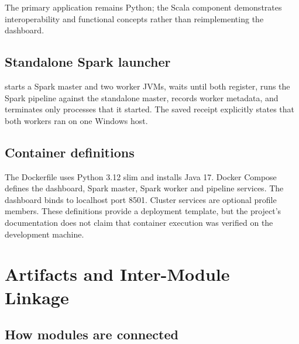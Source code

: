 \documentclass[12pt,a4paper]{report}
\begin{document}
The primary application remains Python; the Scala component demonstrates interoperability and functional concepts rather than reimplementing the dashboard.

\section{Standalone Spark launcher}

 starts a Spark master and two worker JVMs, waits until both register, runs the Spark pipeline against the standalone master, records worker metadata, and terminates only processes that it started. The saved receipt explicitly states that both workers ran on one Windows host.

\section{Container definitions}

The Dockerfile uses Python 3.12 slim and installs Java 17. Docker Compose defines the dashboard, Spark master, Spark worker and pipeline services. The dashboard binds to localhost port 8501. Cluster services are optional profile members. These definitions provide a deployment template, but the project's documentation does not claim that container execution was verified on the development machine.

\chapter{Artifacts and Inter-Module Linkage}

\section{How modules are connected}
\end{document}
